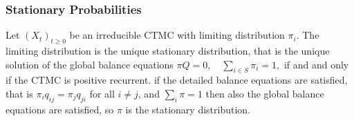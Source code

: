 \subsubsection*{Stationary Probabilities}
 Let $(X_t)_{t \ge 0}$ be an irreducible CTMC with limiting distribution $\pi_i$. The limiting distribution is the unique stationary distribution, that is the unique solution of the global balance equations 
$\pi Q = 0, \quad \sum_{i \in S} \pi_i = 1,$ 
if and  and only if the CTMC is positive recurrent.
 if the detailed balance equations are satisfied, that is 
$\pi_i q_{ij} = \pi_{j}q_{ji}$ for all $i \ne j$, and $\sum_i \pi = 1$ then also the global balance equations are satisfied, so $\pi$ is the stationary distribution.